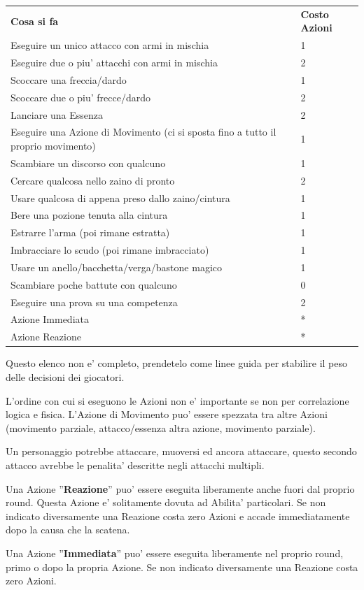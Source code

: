 \documentclass[a4paper,11pt,twoside,openany]{book}
\begin{document}
	\begin{tabular}{ll}
		\toprule
		\textbf{Cosa si fa} & \textbf{Costo Azioni}\tabularnewline
		Eseguire un unico attacco con armi in mischia & 1\tabularnewline
		Eseguire due o piu' attacchi con armi in mischia & 2\tabularnewline
		Scoccare una freccia/dardo & 1\tabularnewline
		Scoccare due o piu' frecce/dardo & 2\tabularnewline
		Lanciare una Essenza & 2\tabularnewline
		Eseguire una Azione di Movimento (ci si sposta fino a tutto
		il proprio movimento) & 1\tabularnewline
		Scambiare un discorso con qualcuno & 1\tabularnewline
		Cercare qualcosa nello zaino di pronto & 2\tabularnewline
		Usare qualcosa di appena preso dallo zaino/cintura & 1\tabularnewline
		Bere una pozione tenuta alla cintura & 1\tabularnewline
		Estrarre l'arma (poi rimane estratta) & 1\tabularnewline
		Imbracciare lo scudo (poi rimane imbracciato) & 1\tabularnewline
		Usare un anello/bacchetta/verga/bastone magico & 1\tabularnewline
		Scambiare poche battute con qualcuno & 0\tabularnewline
		Eseguire una prova su una competenza & 2\tabularnewline
		Azione Immediata & {*}\tabularnewline
		Azione Reazione & {*}\tabularnewline
		
	\end{tabular}
	
	\smallskip
	
	Questo elenco non e' completo, prendetelo come linee guida per stabilire il peso delle decisioni dei giocatori.
	
	\bigskip
	
	L'ordine con cui si eseguono le Azioni non e' importante se non per correlazione logica e fisica. L'Azione di Movimento puo' essere spezzata tra altre Azioni (movimento parziale, attacco/essenza altra azione, movimento parziale).
	
	Un personaggio potrebbe attaccare, muoversi ed ancora attaccare, questo secondo attacco avrebbe le penalita' descritte negli attacchi multipli.
	\smallskip
	
	Una Azione ''\textbf{Reazione}'' puo' essere eseguita liberamente anche fuori dal proprio round. Questa Azione e' solitamente dovuta ad Abilita' particolari. Se non indicato diversamente una Reazione costa zero Azioni e accade immediatamente dopo la causa che la scatena.
	\smallskip
	
	Una Azione ''\textbf{Immediata}'' puo' essere eseguita liberamente nel proprio round, primo o dopo la propria Azione. Se non indicato diversamente una Reazione costa zero Azioni.
	
\end{document}
